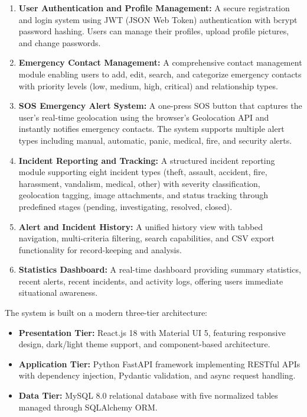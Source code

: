 \begin{enumerate}[label=\arabic*.]
  \item \textbf{User Authentication and Profile Management:} A secure registration and login system using JWT (JSON Web Token) authentication with bcrypt password hashing. Users can manage their profiles, upload profile pictures, and change passwords.

  \item \textbf{Emergency Contact Management:} A comprehensive contact management module enabling users to add, edit, search, and categorize emergency contacts with priority levels (low, medium, high, critical) and relationship types.

  \item \textbf{SOS Emergency Alert System:} A one-press SOS button that captures the user's real-time geolocation using the browser's Geolocation API and instantly notifies emergency contacts. The system supports multiple alert types including manual, automatic, panic, medical, fire, and security alerts.

  \item \textbf{Incident Reporting and Tracking:} A structured incident reporting module supporting eight incident types (theft, assault, accident, fire, harassment, vandalism, medical, other) with severity classification, geolocation tagging, image attachments, and status tracking through predefined stages (pending, investigating, resolved, closed).

  \item \textbf{Alert and Incident History:} A unified history view with tabbed navigation, multi-criteria filtering, search capabilities, and CSV export functionality for record-keeping and analysis.

  \item \textbf{Statistics Dashboard:} A real-time dashboard providing summary statistics, recent alerts, recent incidents, and activity logs, offering users immediate situational awareness.
\end{enumerate}

The system is built on a modern three-tier architecture:

\begin{itemize}
  \item \textbf{Presentation Tier:} React.js 18 with Material UI 5, featuring responsive design, dark/light theme support, and component-based architecture.
  \item \textbf{Application Tier:} Python FastAPI framework implementing RESTful APIs with dependency injection, Pydantic validation, and async request handling.
  \item \textbf{Data Tier:} MySQL 8.0 relational database with five normalized tables managed through SQLAlchemy ORM.
\end{itemize}

